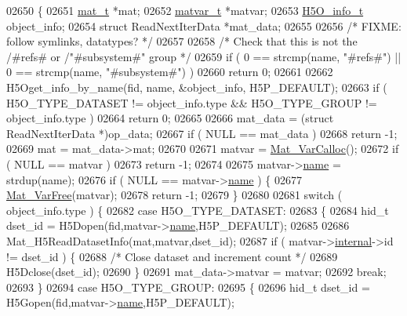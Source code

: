 \begin{DoxyCode}
{{{{{{{{{{02650 \{
02651     \hyperlink{struct__mat__t}{mat\_t} *mat;
02652     \hyperlink{group___m_a_t_structmatvar__t}{matvar\_t} *matvar;
02653     \hyperlink{struct_h5_o__info__t}{H5O\_info\_t} object\_info;
02654     \textcolor{keyword}{struct }ReadNextIterData *mat\_data;
02655 
02656     \textcolor{comment}{/* FIXME: follow symlinks, datatypes? */}
02657 
02658     \textcolor{comment}{/* Check that this is not the /#refs# or /"#subsystem#" group */}
02659     \textcolor{keywordflow}{if} ( 0 == strcmp(name, \textcolor{stringliteral}{"#refs#"}) || 0 == strcmp(name, \textcolor{stringliteral}{"#subsystem#"}) )
02660         \textcolor{keywordflow}{return} 0;
02661 
02662     H5Oget\_info\_by\_name(fid, name, &object\_info, H5P\_DEFAULT);
02663     \textcolor{keywordflow}{if} ( H5O\_TYPE\_DATASET != object\_info.type && H5O\_TYPE\_GROUP != object\_info.type )
02664         \textcolor{keywordflow}{return} 0;
02665 
02666     mat\_data = (\textcolor{keyword}{struct }ReadNextIterData *)op\_data;
02667     \textcolor{keywordflow}{if} ( NULL == mat\_data )
02668         \textcolor{keywordflow}{return} -1;
02669     mat = mat\_data->mat;
02670 
02671     matvar = \hyperlink{group___m_a_t_gae7c9c3699f6e9c31a9c490300013098c}{Mat\_VarCalloc}();
02672     \textcolor{keywordflow}{if} ( NULL == matvar )
02673         \textcolor{keywordflow}{return} -1;
02674 
02675     matvar->\hyperlink{group___m_a_t_a5d4b55b041e3b4fb50c04337f05ad909}{name} = strdup(name);
02676     \textcolor{keywordflow}{if} ( NULL == matvar->\hyperlink{group___m_a_t_a5d4b55b041e3b4fb50c04337f05ad909}{name} ) \{
02677         \hyperlink{group___m_a_t_ga1d14716f7450530fd1c9d02413787f0e}{Mat\_VarFree}(matvar);
02678         \textcolor{keywordflow}{return} -1;
02679     \}
02680 
02681     \textcolor{keywordflow}{switch} ( object\_info.type ) \{
02682         \textcolor{keywordflow}{case} H5O\_TYPE\_DATASET:
02683         \{
02684             hid\_t dset\_id = H5Dopen(fid,matvar->\hyperlink{group___m_a_t_a5d4b55b041e3b4fb50c04337f05ad909}{name},H5P\_DEFAULT);
02685 
02686             Mat\_H5ReadDatasetInfo(mat,matvar,dset\_id);
02687             \textcolor{keywordflow}{if} ( matvar->\hyperlink{group___m_a_t_a6e97e3ed9f40c49322c18561c2a94e92}{internal}->id != dset\_id ) \{
02688                 \textcolor{comment}{/* Close dataset and increment count */}
02689                 H5Dclose(dset\_id);
02690             \}
02691             mat\_data->matvar = matvar;
02692             \textcolor{keywordflow}{break};
02693         \}
02694         \textcolor{keywordflow}{case} H5O\_TYPE\_GROUP:
02695         \{
02696             hid\_t dset\_id = H5Gopen(fid,matvar->\hyperlink{group___m_a_t_a5d4b55b041e3b4fb50c04337f05ad909}{name},H5P\_DEFAULT);
}}}}}}}}}}
\end{DoxyCode}
